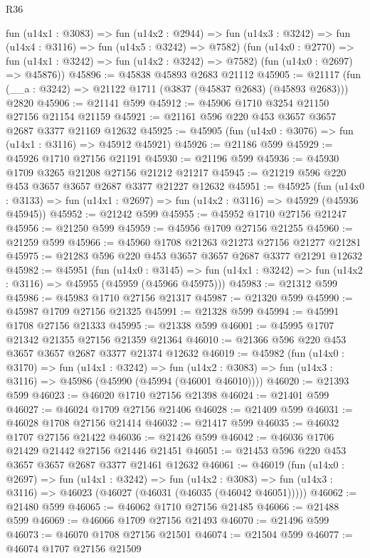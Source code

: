 \begin{lexlean}{R36}
\begin{coremodule}
      fun (u14x1 : @3083) =>
      fun (u14x2 : @2944) =>
      fun (u14x3 : @3242) => fun (u14x4 : @3116) => fun (u14x5 : @3242) => @7582)
      (fun (u14x0 : @2770) => fun (u14x1 : @3242) => fun (u14x2 : @3242) => @7582)
      (fun (u14x0 : @2697) => @45876))
@45896 := @45838 @45893 @2683 @21112
@45905 := @21117 (fun (__a : @3242) => @21122 @1711 (@3837 (@45837 @2683) (@45893 @2683))) @2820
@45906 := @21141 @599
@45912 := @45906 @1710 @3254 @21150 @27156 @21154 @21159
@45921 := @21161 @596 @220 @453 @3657 @3657 @2687 @3377 @21169 @12632
@45925 := @45905 (fun (u14x0 : @3076) => fun (u14x1 : @3116) => @45912 @45921)
@45926 := @21186 @599
@45929 := @45926 @1710 @27156 @21191
@45930 := @21196 @599
@45936 := @45930 @1709 @3265 @21208 @27156 @21212 @21217
@45945 := @21219 @596 @220 @453 @3657 @3657 @2687 @3377 @21227 @12632
@45951 := @45925
    (fun (u14x0 : @3133) => fun (u14x1 : @2697) => fun (u14x2 : @3116) => @45929 (@45936 @45945))
@45952 := @21242 @599
@45955 := @45952 @1710 @27156 @21247
@45956 := @21250 @599
@45959 := @45956 @1709 @27156 @21255
@45960 := @21259 @599
@45966 := @45960 @1708 @21263 @21273 @27156 @21277 @21281
@45975 := @21283 @596 @220 @453 @3657 @3657 @2687 @3377 @21291 @12632
@45982 := @45951
    (fun (u14x0 : @3145) =>
    fun (u14x1 : @3242) => fun (u14x2 : @3116) => @45955 (@45959 (@45966 @45975)))
@45983 := @21312 @599
@45986 := @45983 @1710 @27156 @21317
@45987 := @21320 @599
@45990 := @45987 @1709 @27156 @21325
@45991 := @21328 @599
@45994 := @45991 @1708 @27156 @21333
@45995 := @21338 @599
@46001 := @45995 @1707 @21342 @21355 @27156 @21359 @21364
@46010 := @21366 @596 @220 @453 @3657 @3657 @2687 @3377 @21374 @12632
@46019 := @45982
    (fun (u14x0 : @3170) =>
    fun (u14x1 : @3242) =>
    fun (u14x2 : @3083) => fun (u14x3 : @3116) => @45986 (@45990 (@45994 (@46001 @46010))))
@46020 := @21393 @599
@46023 := @46020 @1710 @27156 @21398
@46024 := @21401 @599
@46027 := @46024 @1709 @27156 @21406
@46028 := @21409 @599
@46031 := @46028 @1708 @27156 @21414
@46032 := @21417 @599
@46035 := @46032 @1707 @27156 @21422
@46036 := @21426 @599
@46042 := @46036 @1706 @21429 @21442 @27156 @21446 @21451
@46051 := @21453 @596 @220 @453 @3657 @3657 @2687 @3377 @21461 @12632
@46061 := @46019
    (fun (u14x0 : @2697) =>
    fun (u14x1 : @3242) =>
    fun (u14x2 : @3083) => fun (u14x3 : @3116) => @46023 (@46027 (@46031 (@46035 (@46042 @46051)))))
@46062 := @21480 @599
@46065 := @46062 @1710 @27156 @21485
@46066 := @21488 @599
@46069 := @46066 @1709 @27156 @21493
@46070 := @21496 @599
@46073 := @46070 @1708 @27156 @21501
@46074 := @21504 @599
@46077 := @46074 @1707 @27156 @21509

\end{coremodule}
\end{lexlean}
